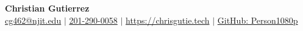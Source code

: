 \documentclass{article}
\begin{document}
\begin{center}
\thispagestyle{empty}
\large \textbf{Christian Gutierrez \\}
\normalsize \href{mailto:cg462@njit.edu}{cg462@njit.edu} $\mid$ \href{tel:2012900058}{201-290-0058} $\mid$ \href{https://chrisgutie.tech}{https://chrisgutie.tech}
 $\mid$ \href{https://github.com/Person1080p}{GitHub: Person1080p}    \\
\hrulefill
\end{center}







\end{document}
